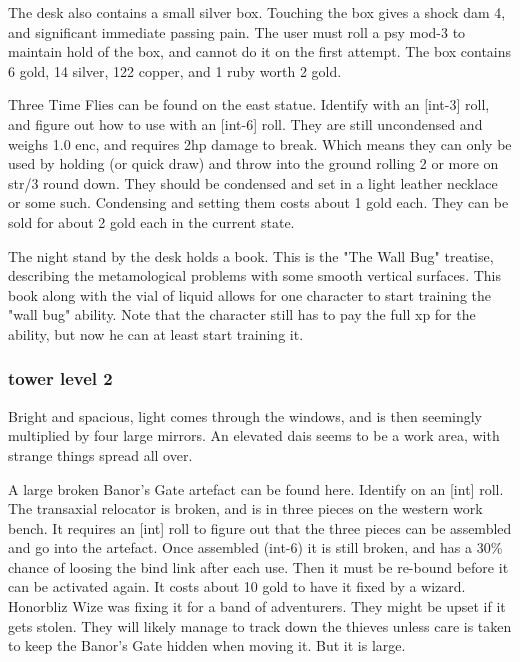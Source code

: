 The desk also contains a small silver box. Touching the box gives a shock dam 4, and significant immediate passing pain. The user must roll a psy mod-3 to maintain hold of the box, and cannot do it on the first attempt. The box contains 6 gold, 14 silver, 122 copper, and 1 ruby worth 2 gold.

Three Time Flies can be found on the east statue. Identify with an [int-3] roll, and figure out how to use with an [int-6] roll. They are still uncondensed and weighs 1.0 enc, and requires 2hp damage to break. Which means they can only be used by holding (or quick draw) and throw into the ground rolling 2 or more on str/3 round down. They should be condensed and set in a light leather necklace or some such. Condensing and setting them costs about 1 gold each. They can be sold for about 2 gold each in the current state.

The night stand by the desk holds a book. This is the "The Wall Bug" treatise, describing the metamological problems with some smooth vertical surfaces. This book along with the vial of liquid allows for one character to start training the "wall bug" ability. Note that the character still has to pay the full xp for the ability, but now he can at least start training it.


\subsubsection*{tower level 2}
\begin{readoutloud}
Bright and spacious, light comes through the windows, and is then seemingly multiplied by four large mirrors. An elevated dais seems to be a work area, with strange things spread all over.
\end{readoutloud}

A large broken Banor's Gate artefact can be found here. Identify on an [int] roll. The transaxial relocator is broken, and is in three pieces on the western work bench. It requires an [int] roll to figure out that the three pieces can be assembled and go into the artefact.
Once assembled (int-6) it is still broken, and has a 30\% chance of loosing the bind link after each use. Then it must be re-bound before it can be activated again.
It costs about 10 gold to have it fixed by a wizard.
Honorbliz Wize was fixing it for a band of adventurers. They might be upset if it gets stolen. They will likely manage to track down the thieves unless care is taken to keep the Banor's Gate hidden when moving it. But it is large.



